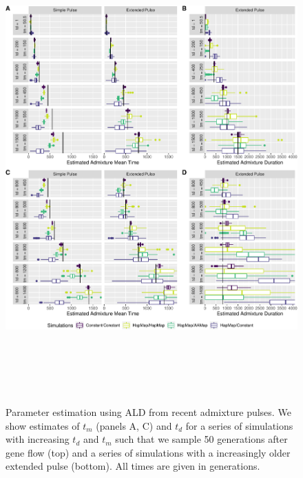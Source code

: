 \documentclass[11pt]{article}
\begin{document}
\begin{figure}
\centering
\includegraphics[width=16cm,height=18cm,keepaspectratio]{Fig_6_MBE-21-0164_R1_Peter_Iasi.pdf}
\caption{\label{fig:Closer_sampling} Parameter estimation using ALD from recent admixture pulses.  We show estimates of $t_m$ (panels A, C) and $t_d$ for a series of simulations with increasing $t_d$ and $t_m$ such that we sample 50 generations after gene flow (top) and a series of simulations with a increasingly older extended pulse (bottom).  All times are given in generations.}
\end{figure}
\end{document}
